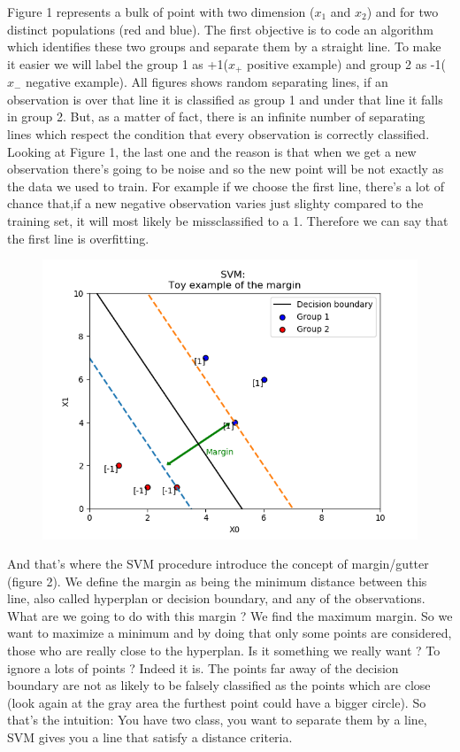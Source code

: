 \documentclass[a4paper,11pt]{article}
\numberwithin{equation}{section}
\begin{document}
Figure 1 represents a bulk of point with two dimension ($x_1$ and $x_2$) and for two distinct populations (red and blue). The first objective is to code an algorithm which identifies these two groups and separate them by a straight line. To make it easier we will label the group 1 as +1($x_+$ positive example) and group 2 as -1($x_-$ negative example). All figures shows random separating lines, if an observation is over that line it is classified as group 1 and under that line it falls in group 2. But, as a matter of fact, there is an infinite number of separating lines which respect the condition that every observation is correctly classified. Looking at Figure 1, the last one and the reason is that when we get a new observation there's going to be noise and so the new point will be not exactly as the data we used to train. For example if we choose the first line, there's a lot of chance that,if a new negative observation varies just slighty compared to the training set, it will most likely be missclassified to a 1. Therefore we can say that the first line is overfitting.  

\begin{figure}[htb]%
    \begin{center}
    \includegraphics[scale = 0.5]{Figure4SVM.png}%
    \label{fig2:example}%
    \end{center}
\end{figure}

And that's where the SVM procedure introduce the concept of margin/gutter (figure 2). We define the margin as being the minimum distance between this line, also called hyperplan or decision boundary, and any of the observations. What are we going to do with this margin ? We find the maximum margin. So we want to maximize a minimum and by doing that only some points are considered, those who are really close to the hyperplan. Is it something we really want ? To ignore a lots of points ? Indeed it is. The points far away of the decision boundary are not as likely to be falsely classified as the points which are close (look again at the gray area the furthest point could have a bigger circle). So that's the intuition: You have two class, you want to separate them by a line, SVM gives you a line that satisfy a distance criteria.
\end{document}
